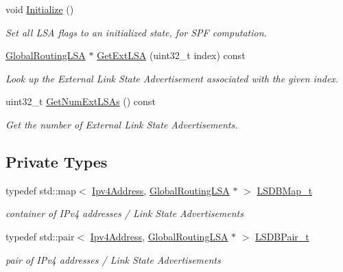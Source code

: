 \begin{DoxyCompactItemize}
void \hyperlink{classns3_1_1GlobalRouteManagerLSDB_a25ea9823747e40df5d43eb64100a5f85}{Initialize} ()
\begin{DoxyCompactList}\small\item\em Set all L\+SA flags to an initialized state, for S\+PF computation. \end{DoxyCompactList}\item 
\hyperlink{classns3_1_1GlobalRoutingLSA}{Global\+Routing\+L\+SA} $\ast$ \hyperlink{classns3_1_1GlobalRouteManagerLSDB_aaf8413863f2002d3a2508e61c4cab64c}{Get\+Ext\+L\+SA} (uint32\+\_\+t index) const 
\begin{DoxyCompactList}\small\item\em Look up the External Link State Advertisement associated with the given index. \end{DoxyCompactList}\item 
uint32\+\_\+t \hyperlink{classns3_1_1GlobalRouteManagerLSDB_ac82114cbf8adfab500e580dd8d66ec69}{Get\+Num\+Ext\+L\+S\+As} () const 
\begin{DoxyCompactList}\small\item\em Get the number of External Link State Advertisements. \end{DoxyCompactList}\end{DoxyCompactItemize}
\subsection*{Private Types}
\begin{DoxyCompactItemize}
\item 
typedef std\+::map$<$ \hyperlink{classns3_1_1Ipv4Address}{Ipv4\+Address}, \hyperlink{classns3_1_1GlobalRoutingLSA}{Global\+Routing\+L\+SA} $\ast$ $>$ \hyperlink{classns3_1_1GlobalRouteManagerLSDB_a1422d1cc4a1e5a1122563e6ec4c12758}{L\+S\+D\+B\+Map\+\_\+t}
\begin{DoxyCompactList}\small\item\em container of I\+Pv4 addresses / Link State Advertisements \end{DoxyCompactList}\item 
typedef std\+::pair$<$ \hyperlink{classns3_1_1Ipv4Address}{Ipv4\+Address}, \hyperlink{classns3_1_1GlobalRoutingLSA}{Global\+Routing\+L\+SA} $\ast$ $>$ \hyperlink{classns3_1_1GlobalRouteManagerLSDB_a3fb44fd823a1445363655df4143f1f4e}{L\+S\+D\+B\+Pair\+\_\+t}
\begin{DoxyCompactList}\small\item\em pair of I\+Pv4 addresses / Link State Advertisements \end{DoxyCompactList}\end{DoxyCompactItemize}
